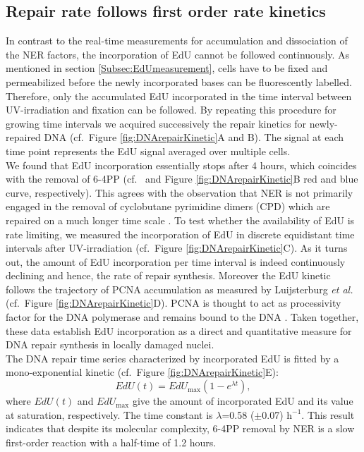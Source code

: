 \subsection{Repair rate follows first order rate kinetics}
\label{firstOrderRateKinetic}
In contrast to the real-time measurements for accumulation and dissociation of the NER factors, the incorporation of EdU cannot be followed continuously. As mentioned in section \ref{Subsec:EdUmeasurement}, cells have to be fixed and permeabilized before the newly incorporated bases can be fluorescently labelled. Therefore, only the accumulated EdU incorporated in the time interval between UV-irradiation and fixation can be followed. By repeating this procedure for growing time intervals we acquired successively the repair kinetics for newly-repaired DNA (cf.\ Figure \ref{fig:DNArepairKinetic}A and B). The signal at each time point represents the EdU signal averaged over multiple cells. \\
We found that EdU incorporation essentially stops after 4 hours, which coincides with the removal of 6-4PP (cf.\ \cite{Luijsterburg2010} and Figure \ref{fig:DNArepairKinetic}B red and blue curve, respectively). This agrees with the observation that NER is not primarily engaged in the removal of cyclobutane pyrimidine dimers (CPD) which are repaired on a much longer time scale \cite{Luijsterburg2010}. To test whether the availability of EdU is rate limiting, we measured the incorporation of EdU in discrete equidistant time intervals after UV-irradiation (cf.\ Figure \ref{fig:DNArepairKinetic}C). As it turns out, the amount of EdU incorporation per time interval is indeed continuously declining and hence, the rate of repair synthesis. Moreover the EdU kinetic follows the trajectory of PCNA accumulation as measured by Luijsterburg \textit{et al.} \cite{Luijsterburg2010} (cf.\ Figure \ref{fig:DNArepairKinetic}D). PCNA is thought to act as processivity factor for the DNA polymerase and remains bound to the DNA \cite{Luijsterburg2010,Essers2005,Sporbert2002}. Taken together, these data establish EdU incorporation as a direct and quantitative measure for DNA repair synthesis in locally damaged nuclei.\\
The DNA repair time series characterized by incorporated EdU is fitted by a mono-exponential kinetic (cf.\ Figure \ref{fig:DNArepairKinetic}E):
\begin{equation}
EdU(t) = EdU_\text{max}(1 - e^{\lambda t}),
\label{Eqn:EdU_kinetic}
\end{equation}  
where $EdU(t)$ and $EdU_{\text{max}}$ give the amount of incorporated EdU and its value at saturation, respectively. The time constant is $\lambda$=0.58 ($\pm$0.07) $\text{h}^{-\text{1}}$. This result indicates that despite its molecular complexity, 6-4PP removal by NER is a slow first-order reaction with a half-time of 1.2 hours.          
